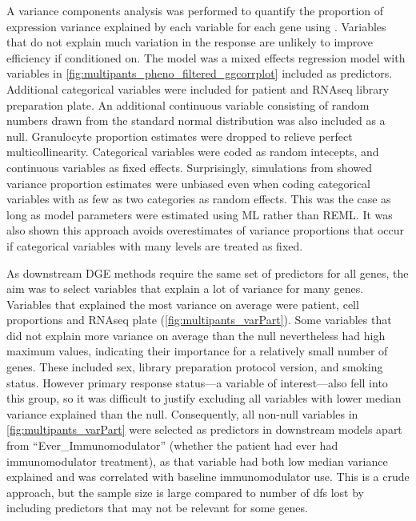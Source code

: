 A variance components analysis was performed to quantify the proportion of expression variance explained by each variable for each gene using  \autocite{hoffman2016VariancePartitionInterpretingDrivers}.
Variables that do not explain much variation in the response are unlikely to improve efficiency if conditioned on.
The model was a mixed effects regression model with variables in \cref{fig:multipants_pheno_filtered_ggcorrplot} included as predictors.
Additional categorical variables were included for patient and \gls{RNAseq} library preparation plate.
An additional continuous variable consisting of random numbers drawn from the standard normal distribution was also included as a null.
Granulocyte proportion estimates were dropped to relieve perfect multicollinearity.
Categorical variables were coded as random intecepts, and continuous variables as fixed effects.
Surprisingly, simulations from \textcite{hoffman2016VariancePartitionInterpretingDrivers} showed variance proportion estimates were unbiased even when coding categorical variables with as few as two categories as random effects. 
This was the case as long as model parameters were estimated using \gls{ML} rather than \gls{REML}. 
It was also shown this approach avoids overestimates of variance proportions that occur if categorical variables with many levels are treated as fixed.

As downstream \gls{DGE} methods require the same set of predictors for all genes, the aim was to select variables that explain a lot of variance for many genes.
Variables that explained the most variance on average were patient, cell proportions and \gls{RNAseq} plate (\cref{fig:multipants_varPart}).
Some variables that did not explain more variance on average than the null nevertheless had high maximum values, indicating their importance for a relatively small number of genes.
These included sex, library preparation protocol version, and smoking status.
However primary response status---a variable of interest---also fell into this group,
so it was difficult to justify excluding all variables with lower median variance explained than the null.
Consequently, all non-null variables in \cref{fig:multipants_varPart} were selected as predictors in downstream models apart from \enquote{Ever\_Immunomodulator} 
(whether the patient had ever had immunomodulator treatment), 
as that variable had both low median variance explained and was correlated with baseline immunomodulator use.
This is a crude approach, but the sample size is large compared to number of \glspl{df} lost by including predictors that may not be relevant for some genes.

